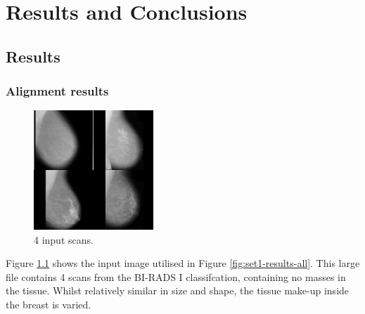 \chapter{Results and Conclusions}




\section{Results}

\subsection{Alignment results}

\begin{figure}[H]
  \centering
  \includegraphics[width=0.4\textwidth]{Chapter3/results-img/big_scan.png}
  \caption{4 input scans.}
  \label{fig:input-data}
\end{figure}

Figure \ref{fig:input-data} shows the input image utilised in Figure \ref{fig:set1-results-all}. This large file contains 4 scans from the BI-RADS I classifcation, containing no masses in the tissue. Whilst relatively similar in size and shape, the tissue make-up inside the breast is varied.

